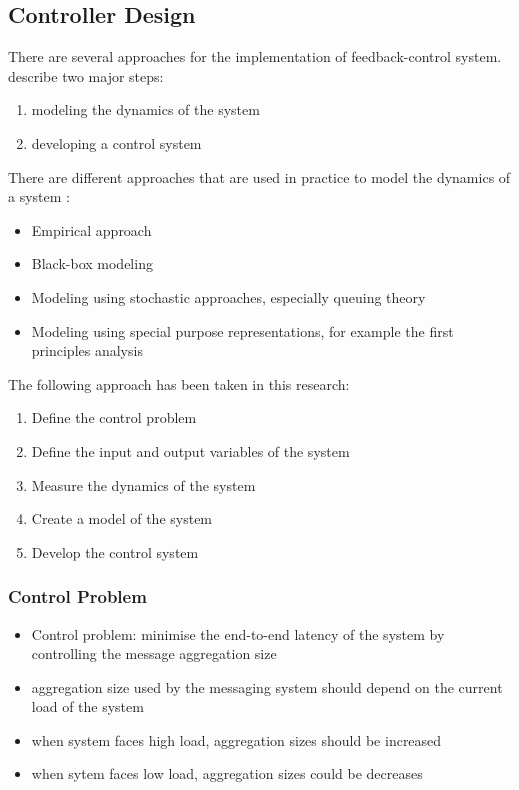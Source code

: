 \subsection{Controller Design}
\label{sec:ch05_controller_design}

There are several approaches for the implementation of feedback-control system. \cite{Hellerstein:2004a} describe two major steps:
\begin{enumerate}
	\item modeling the dynamics of the system
	\item developing a control system
\end{enumerate}

There are different approaches that are used in practice to model the dynamics of a system \citep{Hellerstein:2004tu}:
\begin{itemize}
	\item Empirical approach
	\item Black-box modeling
	\item Modeling using stochastic approaches, especially queuing theory
	\item Modeling using special purpose representations, for example the first principles analysis
\end{itemize}

The following approach has been taken in this research:
\begin{enumerate}
	\item Define the control problem
	\item Define the input and output variables of the system
	\item Measure the dynamics of the system
	\item Create a model of the system
	\item Develop the control system
\end{enumerate}

\subsubsection{Control Problem}

\begin{itemize}
	\item Control problem: minimise the end-to-end latency of the system by controlling the message aggregation size
	\item aggregation size used by the messaging system should depend on the current load of the system
	\item when system faces high load, aggregation sizes should be increased
	\item when sytem faces low load, aggregation sizes could be decreases
\end{itemize}
